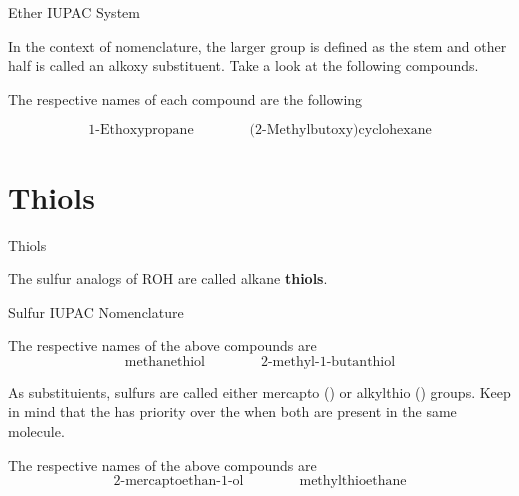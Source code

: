 \documentclass[10pt]{article}
\begin{document}
  \begin{core}{Ether IUPAC System}

    In the context of nomenclature, the larger group is defined as the stem and other half is called an alkoxy substituent. Take a look at the following compounds.


    The respective names of each compound are the following

    \[
      \text{1-Ethoxypropane}\qquad\qquad\text{(2-Methylbutoxy)cyclohexane}
    \]

  \end{core}

\section{Thiols}

  \begin{core}{Thiols}

    The sulfur analogs of ROH are called alkane \textbf{thiols}. 


  \end{core}

  \begin{core}{Sulfur IUPAC Nomenclature}


    The respective names of the above compounds are
    \[
      \text{methanethiol}\qquad\qquad\text{2-methyl-1-butanthiol}
    \]

    As substituients, sulfurs are called either mercapto () or alkylthio () groups. Keep in mind that the  has priority over the  when both are present in the same molecule.


    The respective names of the above compounds are
    \[
      \text{2-mercaptoethan-1-ol}\qquad\qquad\text{methylthioethane}
    \]

  \end{core}
\end{document}
